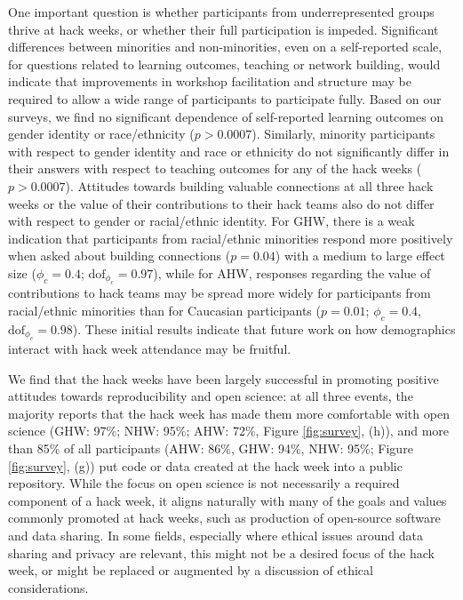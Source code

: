 One important question is whether participants from underrepresented groups thrive at hack weeks, or whether their full participation is impeded. Significant differences between minorities and non-minorities, even on a self-reported scale, for questions related to learning outcomes, teaching or network building, would indicate that improvements in workshop facilitation and structure may be required to allow a wide range of participants to participate fully.
Based on our surveys, we find no significant dependence of self-reported learning outcomes on gender identity or race/ethnicity ($p > 0.0007$). Similarly, minority participants with respect to gender identity and race or ethnicity do not significantly differ in their answers with respect to teaching outcomes for any of the hack weeks ($p > 0.0007$). Attitudes towards building valuable connections at all three hack weeks or the value of their contributions to their hack teams also do not differ with respect to gender or racial/ethnic identity. For GHW, there is a weak indication that participants from racial/ethnic minorities respond more positively when asked about building connections ($p=0.04$) with a medium to large effect size ($\phi_c = 0.4$; $\mathrm{dof}_{\phi_c} = 0.97$), while for AHW, responses regarding the value of contributions to hack teams may be spread more widely for participants from racial/ethnic minorities than for Caucasian participants ($p = 0.01$; $\phi_c = 0.4$, $\mathrm{dof}_{\phi_c} = 0.98$). These initial results indicate that future work on how demographics interact with hack week attendance may be fruitful.

We find that the hack weeks have been largely successful in promoting positive attitudes towards reproducibility and open science: at all three events, the majority reports that the hack week has made them more comfortable with open science  (GHW: 97\%; NHW: 95\%; AHW: 72\%, Figure \ref{fig:survey}, (h)), and more than 85\% of all participants (AHW: 86\%, GHW: 94\%, NHW: 95\%; Figure \ref{fig:survey}, (g)) put code or data created at the hack week into a public repository.
While the focus on open science is not necessarily a required component of a hack week, it aligns naturally with many of the goals and values commonly promoted at hack weeks, such as production of open-source software and data sharing. In some fields, especially where ethical issues around data sharing and privacy are relevant, this might not be a desired focus of the hack week, or might be replaced or augmented by a discussion of ethical considerations.

